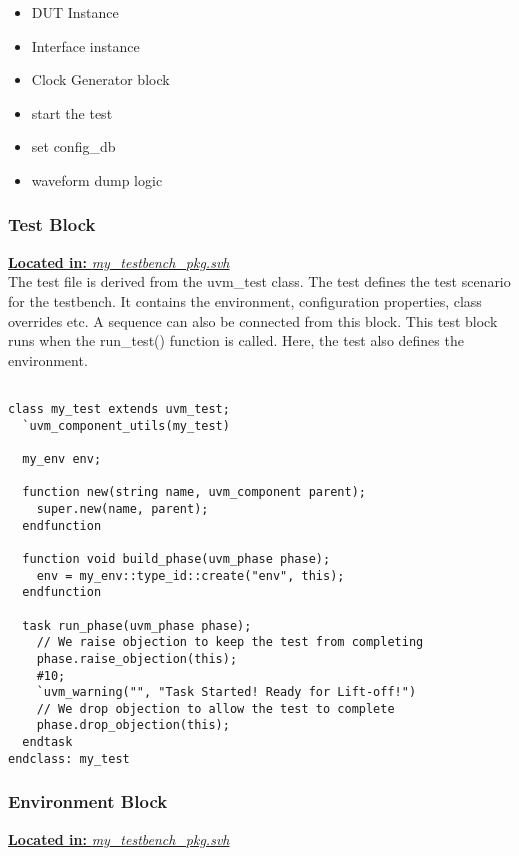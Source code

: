 \documentclass[a4paper,11pt]{article}
\begin{document}
\begin{itemize}[noitemsep]
\item DUT Instance
\item Interface instance
\item Clock Generator block
\item start the test
\item set config\_db
\item waveform dump logic
\end{itemize}
 

\subsubsection{Test Block}
\underline{\textbf{Located in:} \textit{my\_testbench\_pkg.svh}}\\

The test file is derived from the uvm\_test class. The test defines the test scenario for the testbench. It contains the environment, configuration properties, class overrides etc. A sequence can also be connected from this block. This test block runs when the run\_test() function is called. Here, the test also defines the environment.

\begin{lstlisting}[style={verilog-style}, backgroundcolor=\color{lightgray}]

class my_test extends uvm_test;
  `uvm_component_utils(my_test)

  my_env env;

  function new(string name, uvm_component parent);
    super.new(name, parent);
  endfunction

  function void build_phase(uvm_phase phase);
    env = my_env::type_id::create("env", this);
  endfunction

  task run_phase(uvm_phase phase);
    // We raise objection to keep the test from completing
    phase.raise_objection(this);  
    #10;
    `uvm_warning("", "Task Started! Ready for Lift-off!")
    // We drop objection to allow the test to complete
    phase.drop_objection(this);  
  endtask
endclass: my_test
\end{lstlisting}

\FloatBarrier
\subsubsection{Environment Block}
\underline{\textbf{Located in:} \textit{my\_testbench\_pkg.svh}}\\
\end{document}
